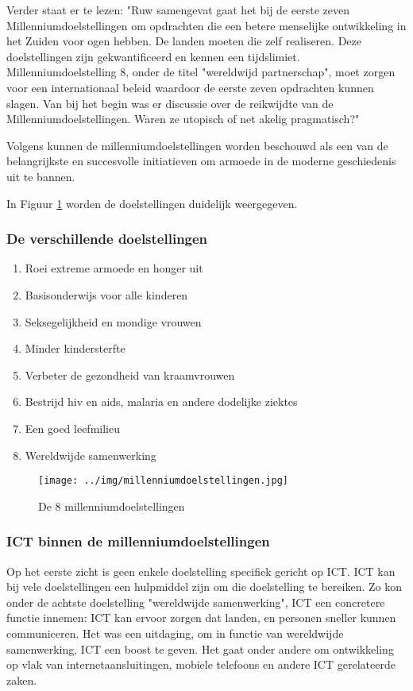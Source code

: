 Verder staat er te lezen: "Ruw samengevat gaat het bij de eerste zeven Millenniumdoelstellingen om opdrachten die een betere menselijke ontwikkeling in het Zuiden voor ogen hebben. De landen moeten die zelf realiseren. Deze doelstellingen zijn gekwantificeerd en kennen een tijdslimiet. Millenniumdoelstelling 8, onder de titel "wereldwijd partnerschap", moet zorgen voor een internationaal beleid waardoor de eerste zeven opdrachten kunnen slagen. Van bij het begin was er discussie over de reikwijdte van de Millenniumdoelstellingen. Waren ze utopisch of net akelig pragmatisch?" \autocite{11.11.112019}

Volgens \autocite{Tjoa2016} kunnen de millenniumdoelstellingen worden beschouwd als een van de belangrijkste en succesvolle initiatieven om armoede in de moderne geschiedenis uit te bannen.

In Figuur \ref{milleniumdoelstellingen} worden de doelstellingen duidelijk weergegeven.

 
 \subsubsection{De verschillende doelstellingen}
 \begin{enumerate}
 \item Roei extreme armoede en honger uit
 \item Basisonderwijs voor alle kinderen
 \item Seksegelijkheid en mondige vrouwen
 \item Minder kindersterfte
 \item Verbeter de gezondheid van kraamvrouwen
 \item Bestrijd hiv en aids, malaria en andere dodelijke ziektes
 \item Een goed leefmilieu 
 \item Wereldwijde samenwerking
\end{enumerate}
\autocite{NOS2015}

\begin{figure}[h!]
	\texttt{[image: ../img/millenniumdoelstellingen.jpg]}
	\caption{De 8 millenniumdoelstellingen \autocite{NOS2015}}
	\label{milleniumdoelstellingen}
\end{figure}

 \subsubsection{ICT binnen de millenniumdoelstellingen}
 Op het eerste zicht is geen enkele doelstelling specifiek gericht op ICT. ICT kan bij vele doelstellingen een hulpmiddel zijn om die doelstelling te bereiken. Zo kon onder de achtste doelstelling "wereldwijde samenwerking", ICT een concretere functie innemen: ICT kan ervoor zorgen dat landen, en personen sneller kunnen communiceren. Het was een uitdaging, om in functie van wereldwijde samenwerking, ICT een boost te geven. Het gaat onder andere om ontwikkeling op vlak van internetaansluitingen, mobiele telefoons en andere ICT gerelateerde zaken. \autocite{NOS2015}
 
